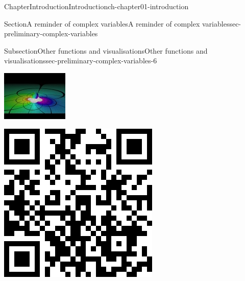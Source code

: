 \documentclass[oneside,10pt,]{book}
\numberwithin{equation}{section}
\begin{document}
\begin{chapterptx}{Chapter}{Introduction}{}{Introduction}{}{}{ch-chapter01-introduction}
\begin{sectionptx}{Section}{A reminder of complex variables}{}{A reminder of complex variables}{}{}{sec-preliminary-complex-variables}
\begin{subsectionptx}{Subsection}{Other functions and visualisations}{}{Other functions and visualisations}{}{}{sec-preliminary-complex-variables-6}
\begin{sidebyside}{2}{0.075}{0.075}{0.17}%
\begin{sbspanel}{0.47}%
\noindent\includegraphics[width=\linewidth]{generated/youtube/sec-preliminary-complex-variables-6-3.jpg}
\end{sbspanel}%
\begin{sbspanel}{0.21}%
\noindent\includegraphics[width=\linewidth]{generated/qrcode/sec-preliminary-complex-variables-6-3.png}

\end{sbspanel}
\end{sidebyside}
\end{subsectionptx}
\end{sectionptx}
\end{chapterptx}
\end{document}
